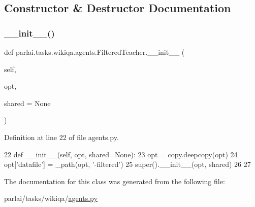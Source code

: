 \subsection{Constructor \& Destructor Documentation}
\mbox{\label{classparlai_1_1tasks_1_1wikiqa_1_1agents_1_1FilteredTeacher_a35563cba37e255a02ee062216736c690}} 
\subsubsection{\texorpdfstring{\+\_\+\+\_\+init\+\_\+\+\_\+()}{\_\_init\_\_()}}
{\footnotesize\ttfamily def parlai.\+tasks.\+wikiqa.\+agents.\+Filtered\+Teacher.\+\_\+\+\_\+init\+\_\+\+\_\+ (\begin{DoxyParamCaption}\item[{}]{self,  }\item[{}]{opt,  }\item[{}]{shared = {\ttfamily None} }\end{DoxyParamCaption})}



Definition at line 22 of file agents.\+py.


\begin{DoxyCode}
22     \textcolor{keyword}{def }\_\_init\_\_(self, opt, shared=None):
23         opt = copy.deepcopy(opt)
24         opt[\textcolor{stringliteral}{'datafile'}] = \_path(opt, \textcolor{stringliteral}{'-filtered'})
25         super().\_\_init\_\_(opt, shared)
26 
27 
\end{DoxyCode}


The documentation for this class was generated from the following file\+:\begin{DoxyCompactItemize}
\item 
parlai/tasks/wikiqa/\hyperlink{parlai_2tasks_2wikiqa_2agents_8py}{agents.\+py}\end{DoxyCompactItemize}
